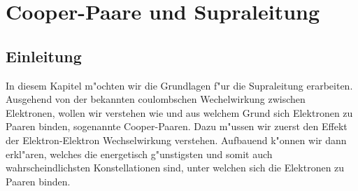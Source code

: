 \chapter{Cooper-Paare und Supraleitung\label{chapter:supraleitung}}
\begin{refsection}




\newpage
\section{Einleitung}
In diesem Kapitel m"ochten wir die Grundlagen f"ur die Supraleitung erarbeiten. Ausgehend von der bekannten coulombschen Wechelwirkung zwischen Elektronen, wollen wir verstehen wie und aus welchem Grund sich Elektronen zu Paaren binden, sogenannte Cooper-Paaren. Dazu m"ussen wir zuerst den Effekt der Elektron-Elektron Wechselwirkung verstehen. Aufbauend k"onnen wir dann erkl"aren, welches die energetisch g"unstigsten und somit auch wahrscheindlichsten Konstellationen sind, unter welchen sich die Elektronen zu Paaren binden.


\end{refsection}
